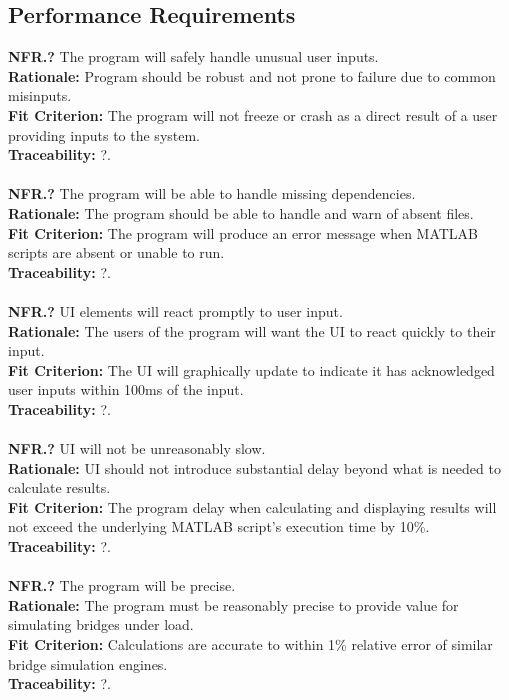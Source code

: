 \documentclass[12pt]{article}
\begin{document}
\subsection{Performance Requirements}

  \textbf{NFR.?} The program will safely handle unusual user inputs.\\
  \textbf{Rationale:} Program should be robust and not prone to failure due to common misinputs.\\
  \textbf{Fit Criterion:} The program will not freeze or crash as a direct result of a user providing inputs to the system.\\
  \textbf{Traceability:} ?.\\\\

  \textbf{NFR.?} The program will be able to handle missing dependencies.\\
  \textbf{Rationale:} The program should be able to handle and warn of absent files.\\
  \textbf{Fit Criterion:} The program will produce an error message when MATLAB scripts are absent or unable to run.\\
  \textbf{Traceability:} ?.\\\\

  \textbf{NFR.?} UI elements will react promptly to user input.\\
  \textbf{Rationale:} The users of the program will want the UI to react quickly to their input.\\
  \textbf{Fit Criterion:} The UI will graphically update to indicate it has acknowledged user inputs within 100ms of the input.\\
  \textbf{Traceability:} ?.\\\\

  \textbf{NFR.?} UI will not be unreasonably slow.\\
  \textbf{Rationale:} UI should not introduce substantial delay beyond what is needed to calculate results.\\
  \textbf{Fit Criterion:} The program delay when calculating and displaying results will not exceed the underlying MATLAB script's execution time by 10\%.\\
  \textbf{Traceability:} ?.\\\\

  \textbf{NFR.?} The program will be precise.\\
  \textbf{Rationale:} The program must be reasonably precise to provide value for simulating bridges under load.\\
  \textbf{Fit Criterion:} Calculations are accurate to within 1\% relative error of similar bridge simulation engines.\\
  \textbf{Traceability:} ?.\\\\
\end{document}

